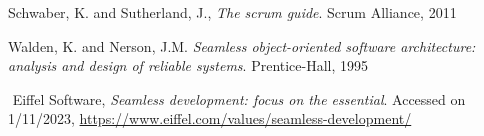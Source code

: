 {\begin{latin}
	\begingroup
	\renewcommand{\section}[2]{}%
	
\begin{thebibliography}{9}
	
Schwaber, K. and Sutherland, J., \textit{The scrum guide}. Scrum Alliance, 2011


Walden, K. and Nerson, J.M.  \textit{Seamless object-oriented software architecture: analysis and design of reliable systems}. Prentice-Hall, 1995

‍‍
Eiffel Software,
\textit{Seamless development: focus on the essential}.
Accessed on 1/11/2023,
\url{https://www.eiffel.com/values/seamless-development/}


	
	
\end{thebibliography}
\endgroup
\end{latin}

}
